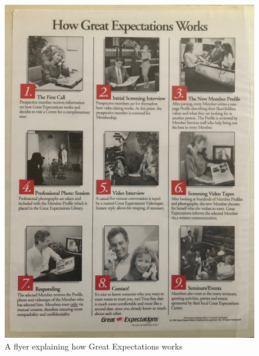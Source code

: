 \begin{figure}[t!]
 \centering
 \includegraphics[scale=0.6]{figures/Introduction/GE2.png}
 \caption{A flyer explaining how Great Expectations works}
 \label{fig:img2}
\end{figure}

